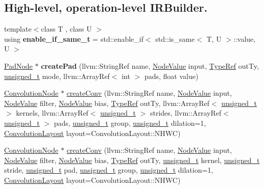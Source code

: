 \subsection*{High-\/level, operation-\/level I\+R\+Builder.}
\begin{DoxyCompactItemize}
\item 
\mbox{\label{classglow_1_1_function_a1a8656058a9f271299328ad88644d5fc}} 
{\footnotesize template$<$class T , class U $>$ }\\using {\bfseries enable\+\_\+if\+\_\+same\+\_\+t} = std\+::enable\+\_\+if$<$ std\+::is\+\_\+same$<$ T, U $>$\+::value, U $>$
\item 
\mbox{\label{classglow_1_1_function_a15cf464c45ccbcae923056644b444ce8}} 
\hyperlink{classglow_1_1_pad_node}{Pad\+Node} $\ast$ {\bfseries create\+Pad} (llvm\+::\+String\+Ref name, \hyperlink{structglow_1_1_node_value}{Node\+Value} input, \hyperlink{structglow_1_1_type}{Type\+Ref} out\+Ty, \hyperlink{namespaceglow_a0ca574644e1e42ef193a9947fb4d8911}{unsigned\+\_\+t} mode, llvm\+::\+Array\+Ref$<$ int $>$ pads, float value)
\item 
\hyperlink{classglow_1_1_convolution_node}{Convolution\+Node} $\ast$ \hyperlink{classglow_1_1_function_a0b28c191e7dbb0c0c83165a7c7107313}{create\+Conv} (llvm\+::\+String\+Ref name, \hyperlink{structglow_1_1_node_value}{Node\+Value} input, \hyperlink{structglow_1_1_node_value}{Node\+Value} filter, \hyperlink{structglow_1_1_node_value}{Node\+Value} bias, \hyperlink{structglow_1_1_type}{Type\+Ref} out\+Ty, llvm\+::\+Array\+Ref$<$ \hyperlink{namespaceglow_a0ca574644e1e42ef193a9947fb4d8911}{unsigned\+\_\+t} $>$ kernels, llvm\+::\+Array\+Ref$<$ \hyperlink{namespaceglow_a0ca574644e1e42ef193a9947fb4d8911}{unsigned\+\_\+t} $>$ strides, llvm\+::\+Array\+Ref$<$ \hyperlink{namespaceglow_a0ca574644e1e42ef193a9947fb4d8911}{unsigned\+\_\+t} $>$ pads, \hyperlink{namespaceglow_a0ca574644e1e42ef193a9947fb4d8911}{unsigned\+\_\+t} group, \hyperlink{namespaceglow_a0ca574644e1e42ef193a9947fb4d8911}{unsigned\+\_\+t} dilation=1, \hyperlink{namespaceglow_aa2f3a33e05699df0f42295c5c4bd1f77}{Convolution\+Layout} layout=Convolution\+Layout\+::\+N\+H\+WC)
\item 
\hyperlink{classglow_1_1_convolution_node}{Convolution\+Node} $\ast$ \hyperlink{classglow_1_1_function_ad16bccb2690886aa72ad02131f9caf2c}{create\+Conv} (llvm\+::\+String\+Ref name, \hyperlink{structglow_1_1_node_value}{Node\+Value} input, \hyperlink{structglow_1_1_node_value}{Node\+Value} filter, \hyperlink{structglow_1_1_node_value}{Node\+Value} bias, \hyperlink{structglow_1_1_type}{Type\+Ref} out\+Ty, \hyperlink{namespaceglow_a0ca574644e1e42ef193a9947fb4d8911}{unsigned\+\_\+t} kernel, \hyperlink{namespaceglow_a0ca574644e1e42ef193a9947fb4d8911}{unsigned\+\_\+t} stride, \hyperlink{namespaceglow_a0ca574644e1e42ef193a9947fb4d8911}{unsigned\+\_\+t} pad, \hyperlink{namespaceglow_a0ca574644e1e42ef193a9947fb4d8911}{unsigned\+\_\+t} group, \hyperlink{namespaceglow_a0ca574644e1e42ef193a9947fb4d8911}{unsigned\+\_\+t} dilation=1, \hyperlink{namespaceglow_aa2f3a33e05699df0f42295c5c4bd1f77}{Convolution\+Layout} layout=Convolution\+Layout\+::\+N\+H\+WC)

\end{DoxyCompactItemize}
